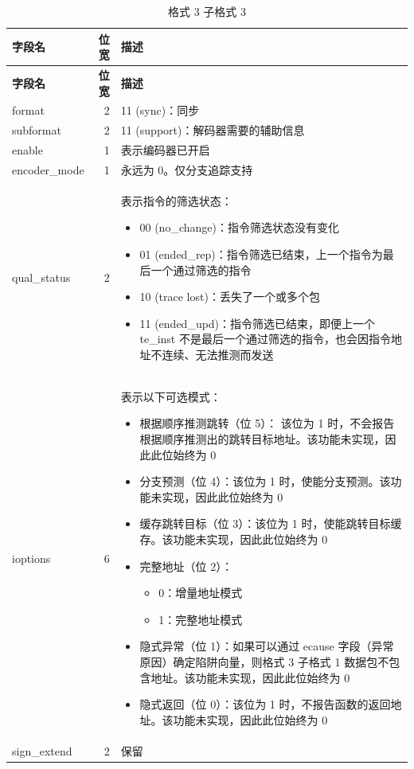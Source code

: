 \documentclass[main\_\_CN.tex]{subfiles}
\begin{document}
\begin{longtable}[c]{ |l|r|L{10cm}| }
    \caption{格式 3 子格式 3}
    \label{tab:f3s3}
    \\\hline{}
    \textbf{字段名} & \textbf{位宽} & \textbf{描述} \\\hline
    \endfirsthead

    \hline
    \textbf{字段名} & \textbf{位宽} & \textbf{描述} \\\hline
    \endhead
    \endfoot
    \endlastfoot

    format & 2 & 11 (sync)：同步 \\\hline
    subformat & 2 & 11 (support)：解码器需要的辅助信息 \\\hline
    enable & 1 & 表示编码器已开启 \\\hline
    encoder\_mode & 1 & 永远为 0。仅分支追踪支持 \\\hline
    qual\_status & 2 & 表示指令的筛选状态：
    \begin{itemize}
        \item 00 (no\_change)：指令筛选状态没有变化
        \item 01 (ended\_rep)：指令筛选已结束，上一个指令为最后一个通过筛选的指令
        \item 10 (trace lost)：丢失了一个或多个包
        \item 11 (ended\_upd)：指令筛选已结束，即便上一个 te\_inst 不是最后一个通过筛选的指令，也会因指令地址不连续、无法推测而发送
        \vspace{-1.5em}
    \end{itemize}
    \\\hline
    ioptions & 6 & 表示以下可选模式：
    \begin{itemize}
        \item 根据顺序推测跳转（位 5）： 该位为 1 时，不会报告根据顺序推测出的跳转目标地址。该功能未实现，因此此位始终为 0
        \item 分支预测（位 4）：该位为 1 时，使能分支预测。该功能未实现，因此此位始终为 0
        \item 缓存跳转目标（位 3）：该位为 1 时，使能跳转目标缓存。该功能未实现，因此此位始终为 0
        \item 完整地址（位 2）：
        \begin{itemize}
            \item 0：增量地址模式
            \item 1：完整地址模式
        \end{itemize}
        \item 隐式异常（位 1）：如果可以通过 ecause 字段（异常原因）确定陷阱向量，则格式 3 子格式 1 数据包不包含地址。该功能未实现，因此此位始终为 0
        \item 隐式返回（位 0）：该位为 1 时，不报告函数的返回地址。该功能未实现，因此此位始终为 0
    \end{itemize}
    \\\hline
    sign\_extend & 2 & 保留 \\\hline

 \end{longtable}
\end{document}
